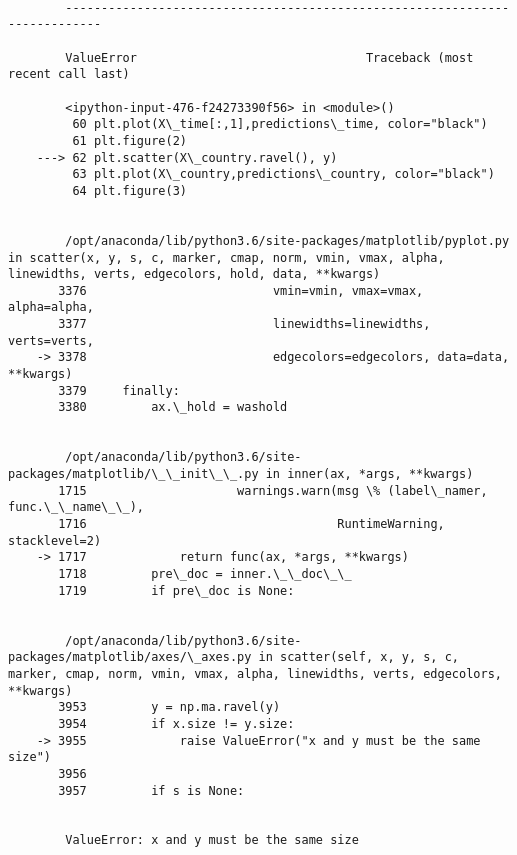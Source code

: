 \documentclass[11pt]{article}
\begin{document}
    \begin{Verbatim}[commandchars=\\\{\}]

        ---------------------------------------------------------------------------

        ValueError                                Traceback (most recent call last)

        <ipython-input-476-f24273390f56> in <module>()
         60 plt.plot(X\_time[:,1],predictions\_time, color="black")
         61 plt.figure(2)
    ---> 62 plt.scatter(X\_country.ravel(), y)
         63 plt.plot(X\_country,predictions\_country, color="black")
         64 plt.figure(3)


        /opt/anaconda/lib/python3.6/site-packages/matplotlib/pyplot.py in scatter(x, y, s, c, marker, cmap, norm, vmin, vmax, alpha, linewidths, verts, edgecolors, hold, data, **kwargs)
       3376                          vmin=vmin, vmax=vmax, alpha=alpha,
       3377                          linewidths=linewidths, verts=verts,
    -> 3378                          edgecolors=edgecolors, data=data, **kwargs)
       3379     finally:
       3380         ax.\_hold = washold


        /opt/anaconda/lib/python3.6/site-packages/matplotlib/\_\_init\_\_.py in inner(ax, *args, **kwargs)
       1715                     warnings.warn(msg \% (label\_namer, func.\_\_name\_\_),
       1716                                   RuntimeWarning, stacklevel=2)
    -> 1717             return func(ax, *args, **kwargs)
       1718         pre\_doc = inner.\_\_doc\_\_
       1719         if pre\_doc is None:


        /opt/anaconda/lib/python3.6/site-packages/matplotlib/axes/\_axes.py in scatter(self, x, y, s, c, marker, cmap, norm, vmin, vmax, alpha, linewidths, verts, edgecolors, **kwargs)
       3953         y = np.ma.ravel(y)
       3954         if x.size != y.size:
    -> 3955             raise ValueError("x and y must be the same size")
       3956 
       3957         if s is None:


        ValueError: x and y must be the same size

    \end{Verbatim}

    \begin{center}
    \end{center}
    { \hspace*{\fill} \\}
    
\end{document}
